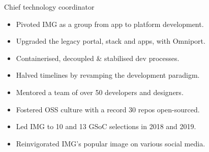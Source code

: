 \rolesubsubsection
  {Chief technology coordinator}
  {}

\begin{sectiondescription}
  \begin{itemize}[nosep, leftmargin = *]
    \item Pivoted IMG as a group from app to platform development.
    \item Upgraded the legacy portal, stack and apps, with Omniport.
    \item Containerised, decoupled \& stabilised dev processes.
    \item Halved timelines by revamping the development paradigm.
    \item Mentored a team of over 50 developers and designers.
    \item Fostered OSS culture with a record 30 repos open-sourced.
    \item Led IMG to 10 and 13 GSoC selections in 2018 and 2019.
    \item Reinvigorated IMG's popular image on various social media.
  \end{itemize}
\end{sectiondescription}